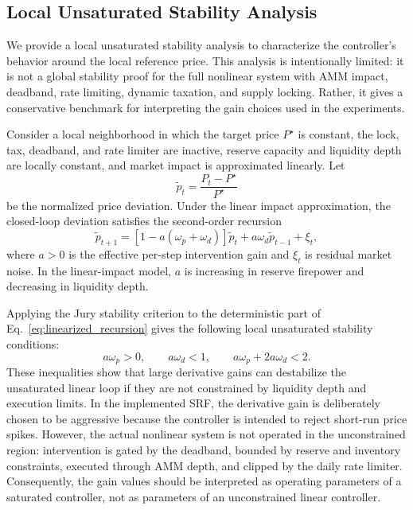 \documentclass[a4paper,fleqn]{cas-dc}
\begin{document}
\subsection{Local Unsaturated Stability Analysis}
\label{subsec:stability}

We provide a local unsaturated stability analysis to characterize the controller's behavior around the local reference price. This analysis is intentionally limited: it is not a global stability proof for the full nonlinear system with AMM impact, deadband, rate limiting, dynamic taxation, and supply locking. Rather, it gives a conservative benchmark for interpreting the gain choices used in the experiments.

Consider a local neighborhood in which the target price $P^{\star}$ is constant, the lock, tax, deadband, and rate limiter are inactive, reserve capacity and liquidity depth are locally constant, and market impact is approximated linearly. Let
\begin{equation}
\widetilde{p}_t
=
\frac{P_t-P^{\star}}{P^{\star}}
\label{eq:price_deviation}
\end{equation}
be the normalized price deviation. Under the linear impact approximation, the closed-loop deviation satisfies the second-order recursion
\begin{equation}
\widetilde{p}_{t+1}
=
\left[
1-a(\omega_p+\omega_d)
\right]\widetilde{p}_t
+
a\omega_d \widetilde{p}_{t-1}
+
\xi_t,
\label{eq:linearized_recursion}
\end{equation}
where $a>0$ is the effective per-step intervention gain and $\xi_t$ is residual market noise. In the linear-impact model, $a$ is increasing in reserve firepower and decreasing in liquidity depth.

Applying the Jury stability criterion to the deterministic part of Eq.~\eqref{eq:linearized_recursion} gives the following local unsaturated stability conditions:
\begin{equation}
a\omega_p>0,
\qquad
a\omega_d<1,
\qquad
a\omega_p+2a\omega_d<2.
\label{eq:jury_conditions}
\end{equation}
These inequalities show that large derivative gains can destabilize the unsaturated linear loop if they are not constrained by liquidity depth and execution limits. In the implemented SRF, the derivative gain is deliberately chosen to be aggressive because the controller is intended to reject short-run price spikes. However, the actual nonlinear system is not operated in the unconstrained region: intervention is gated by the deadband, bounded by reserve and inventory constraints, executed through AMM depth, and clipped by the daily rate limiter. Consequently, the gain values should be interpreted as operating parameters of a saturated controller, not as parameters of an unconstrained linear controller.
\end{document}
